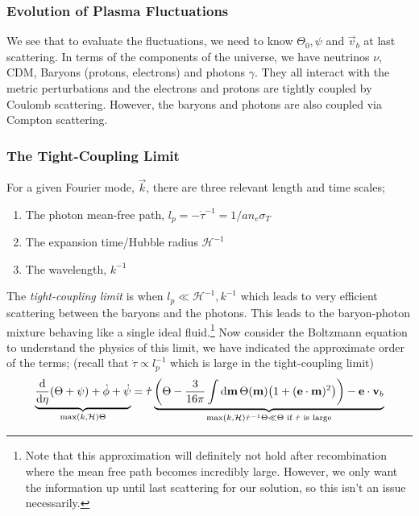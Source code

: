 \subsubsection{Evolution of Plasma Fluctuations}
We see that to evaluate the fluctuations, we need to know $\Theta_0, \psi$ and $\vec{v}_b$ at last scattering. In terms of the components of the universe, we have neutrinos $\nu$, CDM, Baryons (protons, electrons) and photons $\gamma$. They all interact with the metric perturbations and the electrons and protons are tightly coupled by Coulomb scattering. However, the baryons and photons are also coupled via Compton scattering. 
\subsubsection*{The Tight-Coupling Limit}
For a given Fourier mode, $\vec{k}$, there are three relevant length and time scales;
\begin{enumerate}
\item The photon mean-free path, $l_p = -\dot{\tau}^{-1} = 1/a n_e \sigma_T$
\item The expansion time/Hubble radius $\mathcal{H}^{-1}$
\item The wavelength, $k^{-1}$
\end{enumerate}
The \emph{tight-coupling limit} is when $l_p \ll \mathcal{H}^{-1}, k^{-1}$ which leads to very efficient scattering between the baryons and the photons. This leads to the baryon-photon mixture behaving like a single ideal fluid.\footnote{Note that this approximation will definitely not hold after recombination where the mean free path becomes incredibly large. However, we only want the information up until last scattering for our solution, so this isn't an issue necessarily.} Now consider the Boltzmann equation to understand the physics of this limit, we have indicated the approximate order of the terms; (recall that $\dot{\tau} \propto l_{p}^{-1}$ which is large in the tight-coupling limit)
\begin{multline*}
\underbrace{\frac{\ud}{\ud \eta}(\Theta + \psi) + \dot{\phi} + \dot{\psi}}_{\text{max}(k, \hamilt)\Theta} = \dot{\tau}\underbrace{\left(\Theta - \frac{3}{16\pi}\int{\upd{\vec{m}}\Theta(\vec{m})\left(1 + (\vec{e}\cdot\vec{m})^2\right)}\right) - \vec{e}\cdot\vec{v}_b}_{\text{max}\left(k, \hamilt\right)\dot{\tau}^{-1}\Theta \ll \Theta \text{ if } \dot{\tau} \text{ is large}}
\end{multline*}

